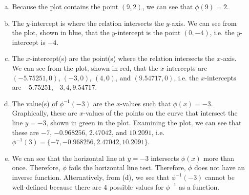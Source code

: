 \documentclass[11pt,letterpaper]{article}
\begin{document}
\sol 
\begin{enumerate}[(a)]
\item Because the plot contains the point $(9, 2)$, we can see that $\phi(9)= 2$. \pspace

\item The $y$-intercept is where the relation intersects the $y$-axis. We can see from the plot, shown in blue, that the $y$-intercept is the point $(0, -4)$, i.e. the $y$-intercept is $-4$. \pspace

\item The $x$-intercept(s) are the point(s) where the relation intersects the $x$-axis. We can see from the plot, shown in red, that the $x$-intercepts are $(-5.75251, 0)$, $(-3, 0)$, $(4, 0)$, and $(9.54717, 0)$, i.e. the $x$-intercepts are $-5.75251, -3, 4, 9.54717$. 

\item The value(s) of $\phi^{-1}(-3)$ are the $x$-values such that $\phi(x)= -3$. Graphically, these are $x$-values of the points on the curve that intersect the line $y= -3$, shown in green in the plot. Examining the plot, we can see that these are $-7$, $-0.968256$, $2.47042$, and $10.2091$, i.e. $\phi^{-1}(3)= \{ -7, -0.968256, 2.47042, 10.2091 \}$. 

\item We can see that the horizontal line at $y= -3$ intersects $\phi(x)$ more than once. Therefore, $\phi$ fails the horizontal line test. Therefore, $\phi$ does not have an inverse function. Alternatively, from (d), we see that $\phi^{-1}(-3)$ cannot be well-defined because there are 4 possible values for $\phi^{-1}$ as a function. 
\end{enumerate}
\end{document}
